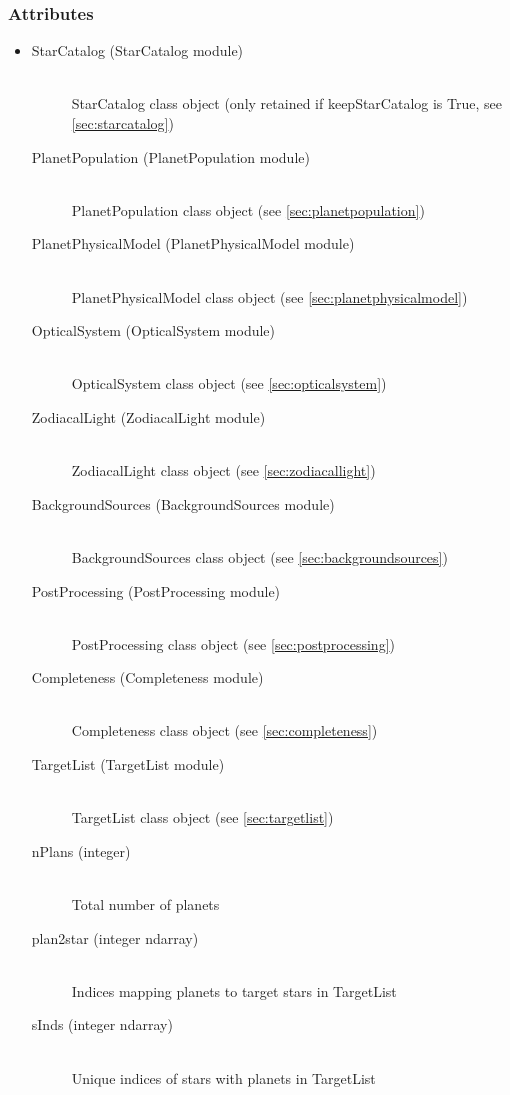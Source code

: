 \documentclass[cleanfoot]{asme2ej}
\begin{document}
\subsubsection{Attributes}
\begin{itemize}
\item
\begin{description}
    \item[StarCatalog (StarCatalog module)]\hfill \\ StarCatalog class object (only retained if keepStarCatalog is True, see \ref{sec:starcatalog})
    \item[PlanetPopulation (PlanetPopulation module)] \hfill \\ PlanetPopulation class object (see \ref{sec:planetpopulation})
    \item[PlanetPhysicalModel (PlanetPhysicalModel module)] \hfill \\ PlanetPhysicalModel class object (see \ref{sec:planetphysicalmodel})
    \item[OpticalSystem (OpticalSystem module)] \hfill \\ OpticalSystem class object (see \ref{sec:opticalsystem})
    \item[ZodiacalLight (ZodiacalLight module)] \hfill \\ ZodiacalLight class object (see \ref{sec:zodiacallight})
    \item[BackgroundSources (BackgroundSources module)] \hfill \\ BackgroundSources class object (see \ref{sec:backgroundsources})
    \item[PostProcessing (PostProcessing module)] \hfill \\ PostProcessing class object (see \ref{sec:postprocessing})
    \item[Completeness (Completeness module)] \hfill \\ Completeness class object (see \ref{sec:completeness})
    \item[TargetList (TargetList module)] \hfill \\ TargetList class object (see \ref{sec:targetlist})
    \item[nPlans (integer)] \hfill \\ Total number of planets
    \item[plan2star (integer ndarray)] \hfill \\ Indices mapping planets to target stars in TargetList
    \item[sInds (integer ndarray)] \hfill \\ Unique indices of stars with planets in TargetList

\end{description}
\end{itemize}
\end{document}
